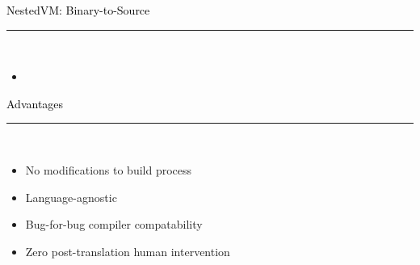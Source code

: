 \documentclass[letter]{seminar}
\begin{document}
\begin{slide}\raggedright
\renewcommand{\leftmargini}{5mm}
{\Large{\textcolor{black}{NestedVM: Binary-to-Source}}}
\\\rule{\textwidth}{0.1pt}\\

\begin{itemize}

\item \begin{figure}[H]
\begin{center}
\end{center}
\end{figure}

\end{itemize}


\end{slide}


\begin{slide}\raggedright
\renewcommand{\leftmargini}{5mm}
{\Large{\textcolor{black}{Advantages}}}
\\\rule{\textwidth}{0.1pt}\\

\begin{itemize}


\item
         No modifications to build process

\item
         Language-agnostic

\item
         Bug-for-bug compiler compatability

\item
         Zero post-translation human intervention


\end{itemize}


\end{slide}
\end{document}
